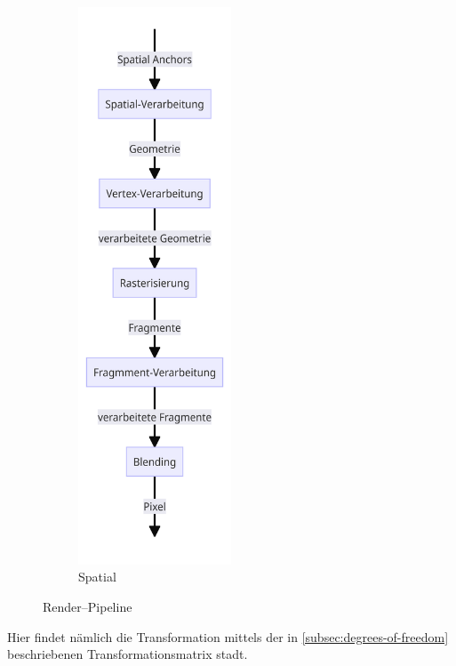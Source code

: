 \begin{figure}[ht!]
\begin{subfigure}{0.5\textwidth}
            \includegraphics[width=0.5\textwidth]{../assets/img/spatial_render_pipline}
            \caption{Spatial}
            \label{subfig:render-pipeline-spatial}
        \end{subfigure}
        \caption{Render--Pipeline}
        \label{fig:render-pipeline}
    \end{figure}

    Hier findet nämlich die Transformation mittels der in \autoref{subsec:degrees-of-freedom} beschriebenen Transformationsmatrix stadt.~\autocite{visualcomputingwh-2023}

